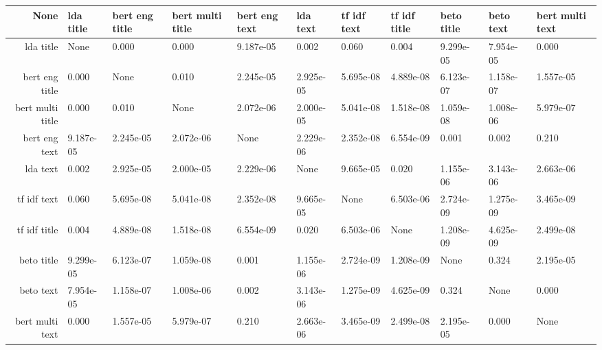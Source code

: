 \begin{tabular}{|r|l|l|l|l|l|l|l|l|l|l|}
  \hline
  None & lda title & bert eng title & bert multi title & bert eng text & lda text & tf idf text & tf idf title & beto title & beto text & bert multi text \\ 
  \hline
  lda title & None & 0.000 & 0.000 & 9.187e-05 & 0.002 & 0.060 & 0.004 & 9.299e-05 & 7.954e-05 & 0.000 \\ 
  \hline
  bert eng title & 0.000 & None & 0.010 & 2.245e-05 & 2.925e-05 & 5.695e-08 & 4.889e-08 & 6.123e-07 & 1.158e-07 & 1.557e-05 \\ 
  \hline
  bert multi title & 0.000 & 0.010 & None & 2.072e-06 & 2.000e-05 & 5.041e-08 & 1.518e-08 & 1.059e-08 & 1.008e-06 & 5.979e-07 \\ 
  \hline
  bert eng text & 9.187e-05 & 2.245e-05 & 2.072e-06 & None & 2.229e-06 & 2.352e-08 & 6.554e-09 & 0.001 & 0.002 & 0.210 \\ 
  \hline
  lda text & 0.002 & 2.925e-05 & 2.000e-05 & 2.229e-06 & None & 9.665e-05 & 0.020 & 1.155e-06 & 3.143e-06 & 2.663e-06 \\ 
  \hline
  tf idf text & 0.060 & 5.695e-08 & 5.041e-08 & 2.352e-08 & 9.665e-05 & None & 6.503e-06 & 2.724e-09 & 1.275e-09 & 3.465e-09 \\ 
  \hline
  tf idf title & 0.004 & 4.889e-08 & 1.518e-08 & 6.554e-09 & 0.020 & 6.503e-06 & None & 1.208e-09 & 4.625e-09 & 2.499e-08 \\ 
  \hline
  beto title & 9.299e-05 & 6.123e-07 & 1.059e-08 & 0.001 & 1.155e-06 & 2.724e-09 & 1.208e-09 & None & 0.324 & 2.195e-05 \\ 
  \hline
  beto text & 7.954e-05 & 1.158e-07 & 1.008e-06 & 0.002 & 3.143e-06 & 1.275e-09 & 4.625e-09 & 0.324 & None & 0.000 \\ 
  \hline
  bert multi text & 0.000 & 1.557e-05 & 5.979e-07 & 0.210 & 2.663e-06 & 3.465e-09 & 2.499e-08 & 2.195e-05 & 0.000 & None \\ 
  \hline
\end{tabular}
